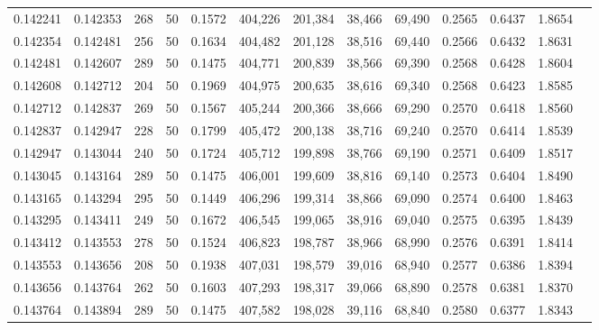\begin{tabular}{rrrrrrrrrrrrr}
0.142241 & 0.142353 &   268 &  50 &                                     0.1572 & 404,226 & 201,384 &  38,466 &  69,490 & 0.2565 & 0.6437 & 1.8654 \\
0.142354 & 0.142481 &   256 &  50 &                                     0.1634 & 404,482 & 201,128 &  38,516 &  69,440 & 0.2566 & 0.6432 & 1.8631 \\
0.142481 & 0.142607 &   289 &  50 &                                     0.1475 & 404,771 & 200,839 &  38,566 &  69,390 & 0.2568 & 0.6428 & 1.8604 \\
0.142608 & 0.142712 &   204 &  50 &                                     0.1969 & 404,975 & 200,635 &  38,616 &  69,340 & 0.2568 & 0.6423 & 1.8585 \\
0.142712 & 0.142837 &   269 &  50 &                                     0.1567 & 405,244 & 200,366 &  38,666 &  69,290 & 0.2570 & 0.6418 & 1.8560 \\
0.142837 & 0.142947 &   228 &  50 &                                     0.1799 & 405,472 & 200,138 &  38,716 &  69,240 & 0.2570 & 0.6414 & 1.8539 \\
0.142947 & 0.143044 &   240 &  50 &                                     0.1724 & 405,712 & 199,898 &  38,766 &  69,190 & 0.2571 & 0.6409 & 1.8517 \\
0.143045 & 0.143164 &   289 &  50 &                                     0.1475 & 406,001 & 199,609 &  38,816 &  69,140 & 0.2573 & 0.6404 & 1.8490 \\
0.143165 & 0.143294 &   295 &  50 &                                     0.1449 & 406,296 & 199,314 &  38,866 &  69,090 & 0.2574 & 0.6400 & 1.8463 \\
0.143295 & 0.143411 &   249 &  50 &                                     0.1672 & 406,545 & 199,065 &  38,916 &  69,040 & 0.2575 & 0.6395 & 1.8439 \\
0.143412 & 0.143553 &   278 &  50 &                                     0.1524 & 406,823 & 198,787 &  38,966 &  68,990 & 0.2576 & 0.6391 & 1.8414 \\
0.143553 & 0.143656 &   208 &  50 &                                     0.1938 & 407,031 & 198,579 &  39,016 &  68,940 & 0.2577 & 0.6386 & 1.8394 \\
0.143656 & 0.143764 &   262 &  50 &                                     0.1603 & 407,293 & 198,317 &  39,066 &  68,890 & 0.2578 & 0.6381 & 1.8370 \\
0.143764 & 0.143894 &   289 &  50 &                                     0.1475 & 407,582 & 198,028 &  39,116 &  68,840 & 0.2580 & 0.6377 & 1.8343 \\

\end{tabular}
